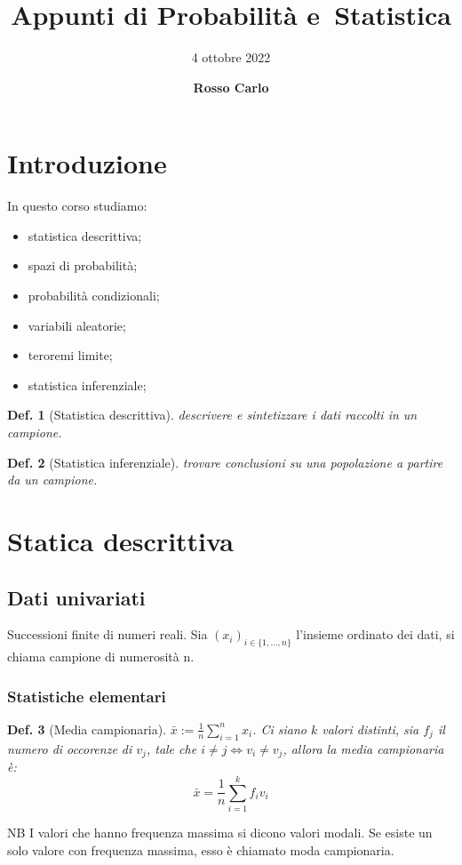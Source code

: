 \documentclass{article}
\title{\vspace{2cm}\textbf{Appunti di Probabilità e\ Statistica}}
\author{\vspace{3mm}4 ottobre 2022}
\date{\vspace{3mm} \textbf{Rosso Carlo}}
\newtheorem{definition}{Def.}[section]
\begin{document}
\begin{titlepage}
	\maketitle
	\thispagestyle{empty}
\end{titlepage}
\tableofcontents
\newpage

\section{Introduzione}
In questo corso studiamo:
\begin{itemize}
	\item statistica descrittiva;
	\item spazi di probabilità;
	\item probabilità condizionali;
	\item variabili aleatorie;
	\item teroremi limite;
	\item statistica inferenziale;
\end{itemize}

\begin{definition}[Statistica descrittiva] 
	descrivere e sintetizzare i dati raccolti in un campione.
\end{definition}

\begin{definition}[Statistica inferenziale] trovare conclusioni su una popolazione a
partire da un campione.
\end{definition}

\section{Statica descrittiva}

\subsection{Dati univariati} 
Successioni finite di numeri reali. Sia $(x_i)_{i
\in \{1, \dots, n\}}$ l'insieme ordinato dei dati, si chiama campione di
numerosità n.

\subsubsection{Statistiche elementari}

\begin{definition}[Media campionaria] $\bar{x} := \frac{1}{n} \sum_{i=1}^n x_i$. Ci
siano $k$ valori distinti, sia $f_j$ il numero di occorenze di $v_j$, tale che
$i \neq j \iff v_i \neq v_j$, allora la media campionaria è:
\begin{equation}
\bar{x} = \frac{1}{n} \sum_{i=1}^k f_i v_i
\end{equation}
\end{definition}
NB I valori che hanno frequenza massima si dicono valori modali. Se esiste un
solo valore con frequenza massima, esso è chiamato moda campionaria.
\end{document}
